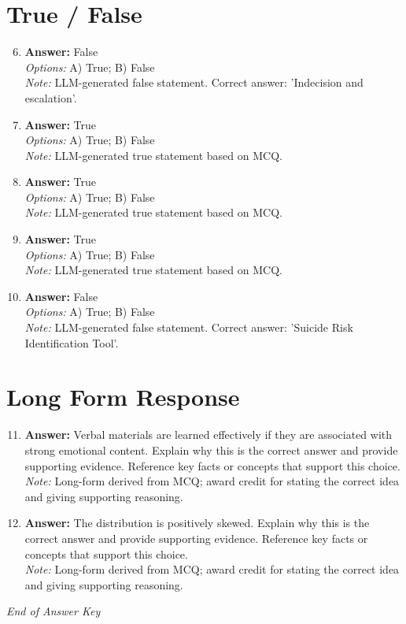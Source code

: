 \documentclass[12pt]{article}
\begin{document}
\section*{True / False}
\begin{enumerate}[label=\arabic*.]
\setcounter{enumi}{5}
\item \textbf{Answer:} False
\\ \textit{Options:} A) True; B) False
\\ \textit{Note:} LLM-generated false statement. Correct answer: 'Indecision and escalation'.
\item \textbf{Answer:} True
\\ \textit{Options:} A) True; B) False
\\ \textit{Note:} LLM-generated true statement based on MCQ.
\item \textbf{Answer:} True
\\ \textit{Options:} A) True; B) False
\\ \textit{Note:} LLM-generated true statement based on MCQ.
\item \textbf{Answer:} True
\\ \textit{Options:} A) True; B) False
\\ \textit{Note:} LLM-generated true statement based on MCQ.
\item \textbf{Answer:} False
\\ \textit{Options:} A) True; B) False
\\ \textit{Note:} LLM-generated false statement. Correct answer: 'Suicide Risk Identification Tool'.
\end{enumerate}

\section*{Long Form Response}
\begin{enumerate}[label=\arabic*.]
\setcounter{enumi}{10}
\item \textbf{Answer:} Verbal materials are learned effectively if they are associated with strong emotional content. Explain why this is the correct answer and provide supporting evidence. Reference key facts or concepts that support this choice.
\\ \textit{Note:} Long-form derived from MCQ; award credit for stating the correct idea and giving supporting reasoning.
\item \textbf{Answer:} The distribution is positively skewed. Explain why this is the correct answer and provide supporting evidence. Reference key facts or concepts that support this choice.
\\ \textit{Note:} Long-form derived from MCQ; award credit for stating the correct idea and giving supporting reasoning.
\end{enumerate}

\vfill
\noindent\textit{End of Answer Key}
\end{document}
